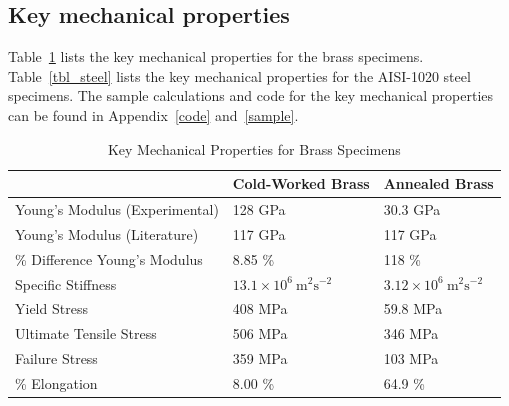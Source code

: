 \documentclass[11pt]{article}
\begin{document}
        \subsection{Key mechanical properties}
            Table~\ref{tbl_brass} lists the key mechanical properties for the brass specimens. 
            Table~\ref{tbl_steel} lists the key mechanical properties for the AISI-1020 steel specimens. 
            The sample calculations and code for the key mechanical properties can be found in Appendix~\ref{code} and~\ref{sample}.
            \begin{table}[H]
                \caption{Key Mechanical Properties for Brass Specimens}
                \begin{minipage}{\linewidth}
                    \centering
                    \begin{tabular}{@{}lll@{}}
                        \toprule
                        & Cold-Worked Brass & Annealed Brass \\ 
                        \midrule
                        Young's Modulus (Experimental) & 128 GPa & 30.3 GPa \\
                        Young's Modulus (Literature)   & 117 GPa & 117 GPa \\
                        \% Difference Young's Modulus & 8.85 \% & 118 \% \\
                        Specific Stiffness & \(13.1\times10^6\ \text{m}^2\text{s}^{-2}\) & \(3.12\times10^6\ \text{m}^2\text{s}^{-2}\) \\
                        Yield Stress & 408 MPa & 59.8 MPa \\
                        Ultimate Tensile Stress & 506 MPa & 346 MPa \\
                        Failure Stress & 359 MPa & 103 MPa \\
                        \% Elongation & 8.00 \% & 64.9 \% \\ 
                        \bottomrule
                        \end{tabular}\label{tbl_brass}
                \end{minipage}
            \end{table}
\end{document}
